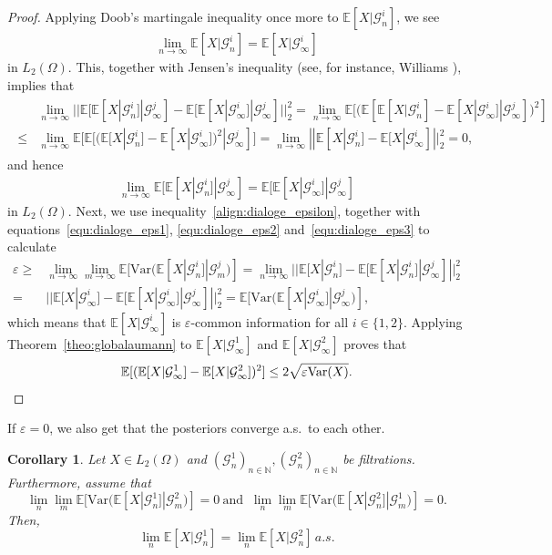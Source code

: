 \documentclass[a4paper, 10pt]{article}
\numberwithin{theorem}{section}
\newtheorem{corollary}[theorem]{Corollary}
\theoremstyle{definition}
\newcommand{\N}{\mathbb{N}}
\newcommand{\E}{\mathbb{E}}
\newcommand{\G}{\mathcal{G}}
\newcommand{\Var}{\mathrm{Var}}
\renewcommand{\epsilon}{\varepsilon}
\begin{document}
\begin{proof}
Applying Doob's martingale inequality once more to $\E[X|\G^i_n]$, we see
\begin{align}\label{equ:dialoge_eps2}
	\lim_{n\to\infty} \E[X|\G^i_n] = \E[X|\G^i_\infty]
\end{align}
in $L_2(\Omega)$. This, together with Jensen's inequality (see, for instance, Williams \cite[p.\ 88]{Wi91}), implies that
\begin{align*}
	\begin{split}
	&\lim_{n\to\infty} || \E[ \E[X|\G^i_n]|\G^j_\infty] -  \E[ \E[X|\G^i_\infty]|\G^j_\infty] ||^2_2 = \lim_{n\to\infty} \E[ (\E[\E[X|\G^i_n] - \E[X|\G^i_\infty] |\G^j_\infty])^2] \\ \leq & \lim_{n\to\infty} \E[ \E[(\E[X|\G^i_n] - \E[X|\G^i_\infty])^2 |\G^j_\infty]]  = \lim_{n\to\infty} ||\E[X|\G^i_n] - \E[X|\G^i_\infty] ||^2_2 =0,
	\end{split}
\end{align*}
and hence
\begin{align}\label{equ:dialoge_eps3}
\lim_{n\to\infty}  \E[ \E[X|\G^i_n]|\G^j_\infty] =  \E[ \E[X|\G^i_\infty]|\G^j_\infty]
\end{align}
in $L_2(\Omega)$.
Next, we use inequality~\eqref{align:dialoge_epsilon}, together with equations~\eqref{equ:dialoge_eps1}, \eqref{equ:dialoge_eps2} and~\eqref{equ:dialoge_eps3} to calculate
\begin{align*}
	\epsilon \geq &\lim_{n\to\infty} \lim_{m\to\infty}  \E[ \Var(\E[X |\G^i_n]|\G^j_m)] = \lim_{n\to\infty} || \E[X|\G^i_n] - \E[ \E[X|\G^i_n]|\G^j_\infty] ||^2_2 \\ =& || \E[X|\G^i_\infty] - \E[ \E[X|\G^i_\infty]|\G^j_\infty] ||^2_2 = \E[\Var(\E[X|\G^i_\infty]|\G^j_\infty)] ,
\end{align*}
which means that $\E[X|\G^i_\infty]$ is $\epsilon$-common information for all $i \in \{1,2\}$. Applying Theorem~\ref{theo:globalaumann} to $\E[X|\G^1_\infty]$ and $\E[X|\G^2_\infty]$ proves that
\[ \E[( \E[X|\G^1_\infty] -  \E[X|\G^2_\infty] )^2] \le  2\sqrt{\epsilon \Var{(X)}}. \qedhere \]
\end{proof}

If $\epsilon=0$, we also get that the posteriors converge a.s.\ to each other.

\begin{corollary}
			Let $X \in L_2(\Omega)$ and $(\G^1_n)_{n\in \N}, (\G^2_n)_{n\in \N}$ be filtrations. Furthermore, assume that 
	$$
	\lim_n \lim_m \E[\Var(\E[X |\G^1_n]|\G^2_m)] =0	\ \text{and } \	\lim_n \lim_m \E[\Var(\E[X |\G^2_n]|\G^1_m)] =0.
	$$
	Then, $$\lim_n\E[X|\G^1_n]= \lim_n\E[X|\G^2_n] \, a.s.$$

\end{corollary}
\end{document}

